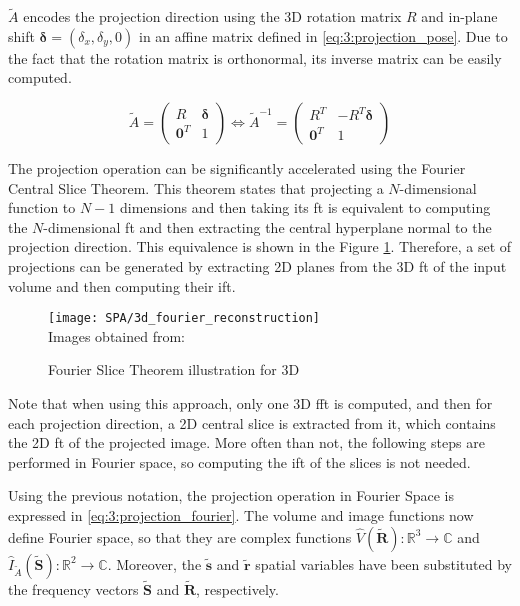 \documentclass[../main.tex]{subfiles}
\begin{document}
$\tilde{A}$ encodes the projection direction using the 3D rotation matrix $R$ and in-plane shift $\bm{\delta} = (\delta_x, \delta_y, 0)$ in an affine matrix defined in \eqref{eq:3:projection_pose}. Due to the fact that the rotation matrix is orthonormal, its inverse matrix can be easily computed.

\begin{equation}\label{eq:3:projection_pose}
    \tilde{A} = 
    \begin{pmatrix}
        R & \bm{\delta} \\
        \bm{0}^T & 1
    \end{pmatrix}
    \Leftrightarrow
    \tilde{A}^{-1} = 
    \begin{pmatrix}
        R^T & -R^T\bm{\delta} \\
        \bm{0}^T & 1
    \end{pmatrix}
\end{equation}

The projection operation can be significantly accelerated using the Fourier Central Slice Theorem. This theorem states that projecting a $N$-dimensional function to $N-1$ dimensions and then taking its \gls{ft} is equivalent to computing the $N$-dimensional \gls{ft} and then extracting the central hyperplane normal to the projection direction\cite{kak2001}. This equivalence is shown in the Figure \ref{fig:4:3dfourier}. Therefore, a set of projections can be generated by extracting 2D planes from the 3D \gls{ft} of the input volume and then computing their \gls{ift}.

\begin{figure}[htbp]
    \centering
    \texttt{[image: SPA/3d\_fourier\_reconstruction]}\\
    Images obtained from: \cite{nogales2015}
    \caption{Fourier Slice Theorem illustration for 3D}
    \label{fig:4:3dfourier}
\end{figure}

Note that when using this approach, only one 3D \gls{fft} is computed, and then for each projection direction, a 2D central slice is extracted from it, which contains the 2D \gls{ft} of the projected image. More often than not, the following steps are performed in Fourier space, so computing the \gls{ift} of the slices is not needed.

Using the previous notation, the projection operation in Fourier Space is expressed in \eqref{eq:3:projection_fourier}. The volume and image functions now define Fourier space, so that they are complex functions $\hat{V}(\bm{\tilde{R}}): \mathbb{R}^3 \rightarrow \mathbb{C}$ and $\hat{I}_{\tilde{A}}(\bm{\tilde{S}}): \mathbb{R}^2 \rightarrow \mathbb{C}$. Moreover, the $\bm{\tilde{s}}$ and $\bm{\tilde{r}}$ spatial variables have been substituted by the frequency vectors $\bm{\tilde{S}}$ and $\bm{\tilde{R}}$, respectively\cite{sorzano2017b}.
\end{document}

